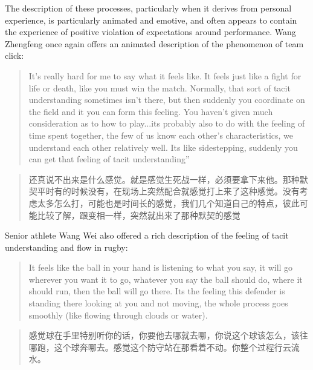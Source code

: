 \begin{CJK}{UTF8}{gbsn}
The description of these processes, particularly when it derives from personal experience, is particularly animated and emotive, and often appears to contain the experience of positive violation of expectations around performance.  Wang Zhengfeng once again offers an animated description of the phenomenon of team click:

  \begin{quotation}
    It’s really hard for me to say what it feels like.  It feels just like a fight for life or death, like you must win the match.  Normally, that sort of tacit understanding sometimes isn’t there, but then suddenly you coordinate on the field and it you can form this feeling. You haven't given much consideration as to how to play...its probably also to do with the feeling of time spent together, the few of us know each other’s characteristics, we understand each other relatively well.  Its like sidestepping, suddenly you can get that feeling of tacit understanding”
  \end{quotation}

  \begin{quotation}
    还真说不出来是什么感觉。就是感觉生死战一样，必须要拿下来他。那种默契平时有的时候没有，在现场上突然配合就感觉打上来了这种感觉。没有考虑太多怎么打，可能也是时间长的感觉，我们几个知道自己的特点，彼此可能比较了解，跟变相一样，突然就出来了那种默契的感觉 
  \end{quotation}

Senior athlete Wang Wei also offered a rich description of the feeling of tacit understanding and flow in rugby:

  \begin{quotation}
    It feels like the ball in your hand is listening to what you say, it will go wherever you want it to go, whatever you say the ball should do, where it should run, then the ball will go there.  Its the feeling this defender is standing there looking at you and not moving, the whole process goes smoothly (like flowing through clouds or water).
  \end{quotation}

  \begin{quotation}
    	感觉球在手里特别听你的话，你要他去哪就去哪，你说这个球该怎么，该往哪跑，这个球奔哪去。感觉这个防守站在那看着不动。你整个过程行云流水。
  \end{quotation}



\end{CJK}
